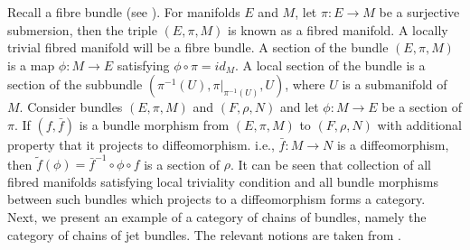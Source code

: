 \documentclass{amsart}
\theoremstyle{plain}
\begin{document}
Recall a fibre bundle (see \cite{Saun}). 	For manifolds $E$ and $M$, let $\pi: E \rightarrow M $ be a surjective submersion, then the triple $(E, \pi, M)$ is known as a  fibred manifold. A locally trivial fibred manifold will be a fibre bundle. A  section  of the bundle $(E, \pi, M)$ is a map $\phi: M \rightarrow E$ satisfying $\phi \circ \pi = id_M$. A local section  of the bundle is a section of the subbundle $(\pi^{-1}(U), \pi|_{\pi^{-1}(U)}, U)$, where $U$ is a submanifold of $M$. Consider bundles $(E,\pi, M)$ and $(F,\rho, N)$ and let $\phi: M \rightarrow E$ be a section of $\pi$. If $(f,\bar{f})$ is a bundle morphism from  $(E,\pi, M)$ to $(F,\rho, N)$ with additional property that it projects to diffeomorphism. i.e., $\bar{f}: M \rightarrow N$ is a diffeomorphism, then $\tilde{f}(\phi) = \bar{f}^{-1} \circ \phi \circ f$ is a section of $\rho$.
It can be seen that collection of all fibred manifolds satisfying local triviality condition and all bundle morphisms between such bundles which projects to a diffeomorphism forms a category.\\
Next, we present an example of a category of chains of bundles, namely the category of chains of jet bundles. The relevant notions are taken from \cite{Saun}.
\end{document}
